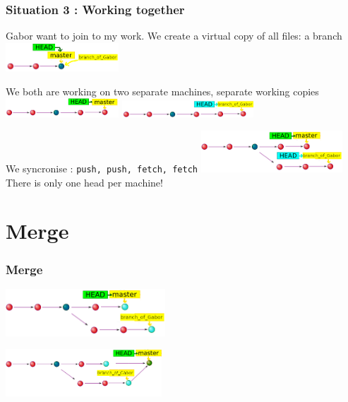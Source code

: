 \documentclass[aspectratio=169]{beamer}
\begin{document}
\begin{frame}
\frametitle<presentation>{Situation 3 : Working together}

\begin{block}{Gabor want to join to my work. We create a virtual copy of all files: a branch}
	\includegraphics[width=120pt]{pictures/git-mater-working-simultanously-1.png}
	\end{block}
	
	\begin{block}{We both are working on two separate machines, separate working copies }
	\includegraphics[width=120pt]{pictures/git-mater-working-simultanously-2.png}
	\hfill
	\includegraphics[width=140pt]{pictures/git-mater-working-simultanously-3.png}
	\end{block}
	
	\begin{block}{We syncronise : \texttt{push, push, fetch, fetch}}
	\includegraphics[width=150pt]{pictures/git-mater-working-simultanously-4.png}
	There is only one head per machine!
	\end{block}
	
	 
	
\end{frame}

\section{Merge}


\begin{frame}
	\frametitle<presentation>{Merge}
	\begin{block}{}
	\includegraphics[height=50pt]{pictures/merge-1.png}
	\end{block}
	
	\begin{block}{}
	\includegraphics[height=50pt]{pictures/merge-2.png}
	\end{block}
		
\end{frame}
\end{document}
